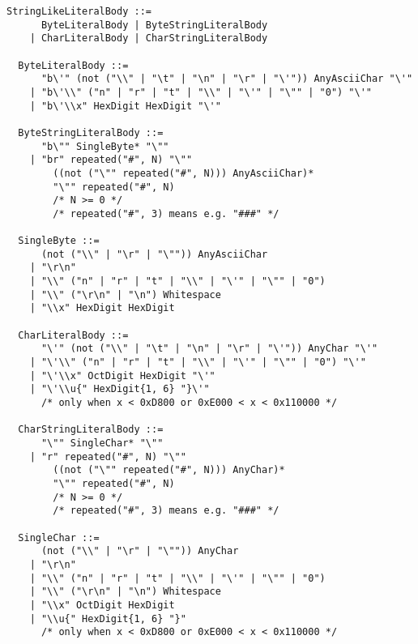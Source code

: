 \documentclass[dvipdfmx,uplatex,papersize,a4paper,10pt]{jsbook}
\theoremstyle{definition}
\begin{document}
\begin{lstlisting}[language=BNFLike, gobble=2]
  StringLikeLiteralBody ::=
      ByteLiteralBody | ByteStringLiteralBody
    | CharLiteralBody | CharStringLiteralBody

  ByteLiteralBody ::=
      "b\'" (not ("\\" | "\t" | "\n" | "\r" | "\'")) AnyAsciiChar "\'"
    | "b\'\\" ("n" | "r" | "t" | "\\" | "\'" | "\"" | "0") "\'"
    | "b\'\\x" HexDigit HexDigit "\'"

  ByteStringLiteralBody ::=
      "b\"" SingleByte* "\""
    | "br" repeated("#", N) "\""
        ((not ("\"" repeated("#", N))) AnyAsciiChar)*
        "\"" repeated("#", N)
        /* N >= 0 */
        /* repeated("#", 3) means e.g. "###" */

  SingleByte ::=
      (not ("\\" | "\r" | "\"")) AnyAsciiChar
    | "\r\n"
    | "\\" ("n" | "r" | "t" | "\\" | "\'" | "\"" | "0")
    | "\\" ("\r\n" | "\n") Whitespace
    | "\\x" HexDigit HexDigit

  CharLiteralBody ::=
      "\'" (not ("\\" | "\t" | "\n" | "\r" | "\'")) AnyChar "\'"
    | "\'\\" ("n" | "r" | "t" | "\\" | "\'" | "\"" | "0") "\'"
    | "\'\\x" OctDigit HexDigit "\'"
    | "\'\\u{" HexDigit{1, 6} "}\'"
      /* only when x < 0xD800 or 0xE000 < x < 0x110000 */

  CharStringLiteralBody ::=
      "\"" SingleChar* "\""
    | "r" repeated("#", N) "\""
        ((not ("\"" repeated("#", N))) AnyChar)*
        "\"" repeated("#", N)
        /* N >= 0 */
        /* repeated("#", 3) means e.g. "###" */

  SingleChar ::=
      (not ("\\" | "\r" | "\"")) AnyChar
    | "\r\n"
    | "\\" ("n" | "r" | "t" | "\\" | "\'" | "\"" | "0")
    | "\\" ("\r\n" | "\n") Whitespace
    | "\\x" OctDigit HexDigit
    | "\\u{" HexDigit{1, 6} "}"
      /* only when x < 0xD800 or 0xE000 < x < 0x110000 */
\end{lstlisting}
\end{document}
